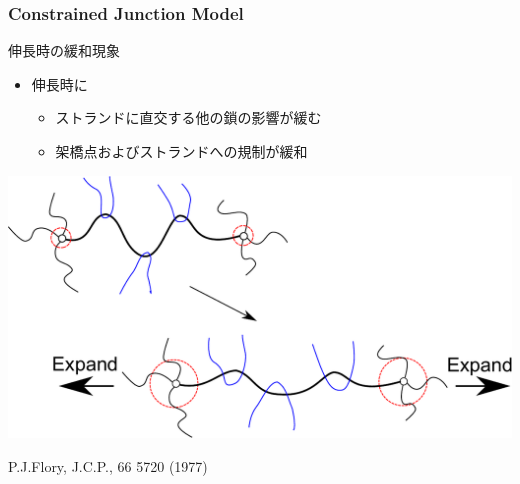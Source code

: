 \documentclass[12pt, dvipdfmx]{beamer}
\newcommand{\backupend}{
   \addtocounter{framenumberappendix}{-\value{framenumber}}
   \addtocounter{framenumber}{\value{framenumberappendix}} 
}
\begin{document}
\begin{frame}
    \frametitle{Constrained Junction Model}
	\begin{exampleblock}{伸長時の緩和現象}
		\begin{itemize}
			\item 伸長時に
			\begin{itemize}
				\item ストランドに直交する他の鎖の影響が緩む
				\item 架橋点およびストランドへの規制が緩和
			\end{itemize}
		\end{itemize}
		\begin{center}
			\includegraphics[width=.7\textwidth]{Constrained_Juntion.pdf}

			P.J.Flory, J.C.P., 66 5720 (1977)
		\end{center}
	\end{exampleblock}
\end{frame}		


\backupend
\end{document}
